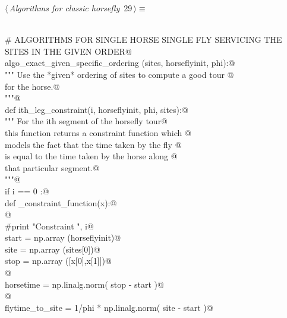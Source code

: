 \documentclass[11.5pt]{report}
\begin{document}
\begin{flushleft} \small\label{scrap24}\raggedright\small
{} $\langle\,${\itshape Algorithms for classic horsefly}\nobreak\ {\footnotesize {29}}$\,\rangle\equiv$
\vspace{-1ex}
\begin{list}{}{} \item
\mbox{}\verb@@\\
\mbox{}\verb@# ALGORITHMS FOR SINGLE HORSE SINGLE FLY SERVICING THE SITES IN THE GIVEN ORDER@\\
\mbox{}\verb@def algo_exact_given_specific_ordering (sites, horseflyinit, phi):@\\
\mbox{}\verb@    """ Use the *given* ordering of sites to compute a good tour @\\
\mbox{}\verb@    for the horse.@\\
\mbox{}\verb@    """@\\
\mbox{}\verb@    def ith_leg_constraint(i, horseflyinit, phi, sites):@\\
\mbox{}\verb@        """ For the ith segment of the horsefly tour@\\
\mbox{}\verb@        this function returns a constraint function which @\\
\mbox{}\verb@        models the fact that the time taken by the fly @\\
\mbox{}\verb@        is equal to the time taken by the horse along @\\
\mbox{}\verb@        that particular segment.@\\
\mbox{}\verb@        """@\\
\mbox{}\verb@        if i == 0 :@\\
\mbox{}\verb@            def _constraint_function(x):@\\
\mbox{}\verb@            @\\
\mbox{}\verb@                #print "Constraint  ", i@\\
\mbox{}\verb@                start = np.array (horseflyinit)@\\
\mbox{}\verb@                site  = np.array (sites[0])@\\
\mbox{}\verb@                stop  = np.array ([x[0],x[1]])@\\
\mbox{}\verb@            @\\
\mbox{}\verb@                horsetime = np.linalg.norm( stop - start )@\\
\mbox{}\verb@            @\\
\mbox{}\verb@                flytime_to_site   = 1/phi * np.linalg.norm( site - start )@\\

\end{list}
\end{flushleft}
\end{document}
